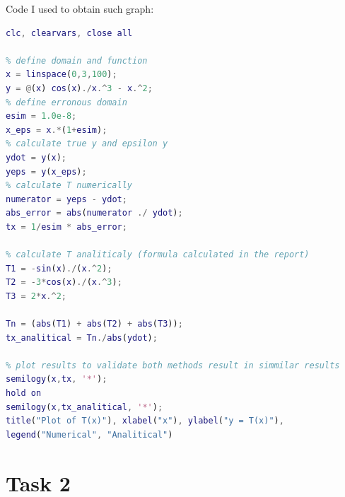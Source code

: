 \documentclass[11pt]{article}
\begin{document}
\pagebreak
Code I used to obtain such graph:
\begin{lstlisting}[language=matlab]
% clear previous experiment results
clc, clearvars, close all

% define domain and function
x = linspace(0,3,100);
y = @(x) cos(x)./x.^3 - x.^2;
% define erronous domain
esim = 1.0e-8;
x_eps = x.*(1+esim);
% calculate true y and epsilon y
ydot = y(x);
yeps = y(x_eps);
% calculate T numerically
numerator = yeps - ydot;
abs_error = abs(numerator ./ ydot);
tx = 1/esim * abs_error;

% calculate T analiticaly (formula calculated in the report)
T1 = -sin(x)./(x.^2);
T2 = -3*cos(x)./(x.^3);
T3 = 2*x.^2;

Tn = (abs(T1) + abs(T2) + abs(T3));
tx_analitical = Tn./abs(ydot);

% plot results to validate both methods result in simmilar results
semilogy(x,tx, '*');
hold on 
semilogy(x,tx_analitical, '*');
title("Plot of T(x)"), xlabel("x"), ylabel("y = T(x)"),
legend("Numerical", "Analitical")
\end{lstlisting}

\pagebreak
\section{Task 2}
\end{document}
